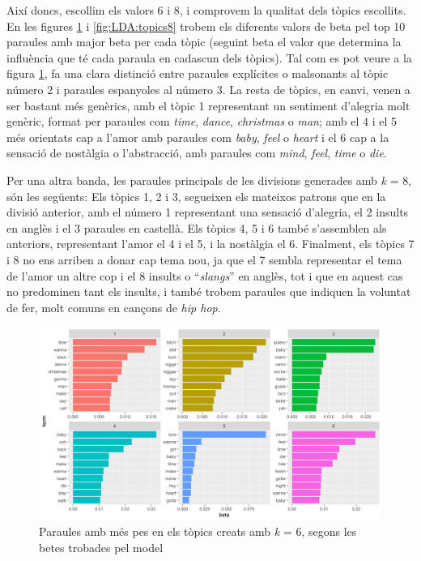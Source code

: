 Així doncs, escollim els valors 6 i 8, i comprovem la qualitat dels tòpics escollits. En les figures \ref{fig:LDA:topics6} i \ref{fig:LDA:topics8} trobem els diferents valors de beta pel top 10 paraules amb major beta per cada tòpic (seguint beta el valor que determina la influència que té cada paraula en cadascun dels tòpics). Tal com es pot veure a la figura \ref{fig:LDA:topics6}, fa una clara distinció entre paraules explícites o malsonants al tòpic número 2 i paraules espanyoles al número 3. La resta de tòpics, en canvi, venen a ser bastant més genèrics, amb el tòpic 1 representant un sentiment d'alegria molt genèric, format per paraules com \textit{time}, \textit{dance}, \textit{christmas} o \textit{man}; amb el 4 i el 5 més orientats cap a l'amor amb paraules com \textit{baby}, \textit{feel} o \textit{heart} i el 6 cap a la sensació de nostàlgia o l'abstracció, amb paraules com \textit{mind}, \textit{feel}, \textit{time} o \textit{die}.

Per una altra banda, les paraules principals de les divisions generades amb \textit{k} = 8, són les següents: Els tòpics 1, 2 i 3, segueixen els mateixos patrons que en la divisió anterior, amb el número 1 representant una sensació d'alegria, el 2 insults en anglès i el 3 paraules en castellà. Els tòpics 4, 5 i 6 també s'assemblen als anteriors, representant l'amor el 4 i el 5, i la nostàlgia el 6. Finalment, els tòpics 7 i 8 no ens arriben a donar cap tema nou, ja que el 7 sembla representar el tema de l'amor un altre cop i el 8 insults o ``\textit{slangs}'' en anglès, tot i que en aquest cas no predominen tant els insults, i també trobem paraules que indiquen la voluntat de fer, molt comuns en cançons de \textit{hip hop}.

\begin{figure}[H]
    \centering
    \includegraphics[width=0.8\linewidth]{Images/8_Textual/LDA/lda_topics6.png}
    \caption{Paraules amb més pes en els tòpics creats amb \textit{k} = 6, segons les betes trobades pel model}
    \label{fig:LDA:topics6}
\end{figure}


